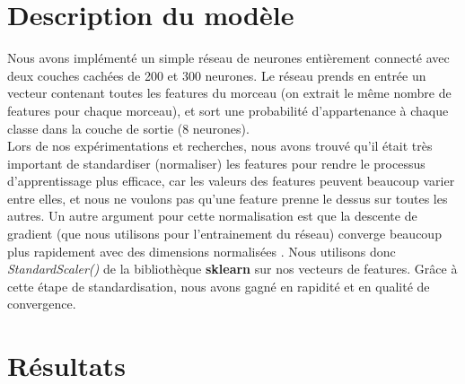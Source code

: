 \documentclass{article}
\begin{document}
\section*{Description du modèle}

Nous avons implémenté un simple réseau de neurones entièrement connecté avec deux couches cachées de 200 et 300 neurones. Le réseau prends en entrée un vecteur contenant toutes les features du morceau (on extrait le même nombre de features pour chaque morceau), et sort une probabilité d'appartenance à chaque classe dans la couche de sortie (8 neurones).\\

Lors de nos expérimentations et recherches, nous avons trouvé qu'il était très important de standardiser (normaliser) les features pour rendre le processus d'apprentissage plus efficace, car les valeurs des features peuvent beaucoup varier entre elles, et nous ne voulons pas qu'une feature prenne le dessus sur toutes les autres. Un autre argument pour cette normalisation est que la descente de gradient (que nous utilisons pour l'entrainement du réseau) converge beaucoup plus rapidement avec des dimensions normalisées \cite{DBLP:journals/corr/IoffeS15}. Nous utilisons donc \textit{StandardScaler()} de la bibliothèque \textbf{sklearn} sur nos vecteurs de features. Grâce à cette étape de standardisation, nous avons gagné en rapidité et en qualité de convergence.



\section*{Résultats}
\end{document}
